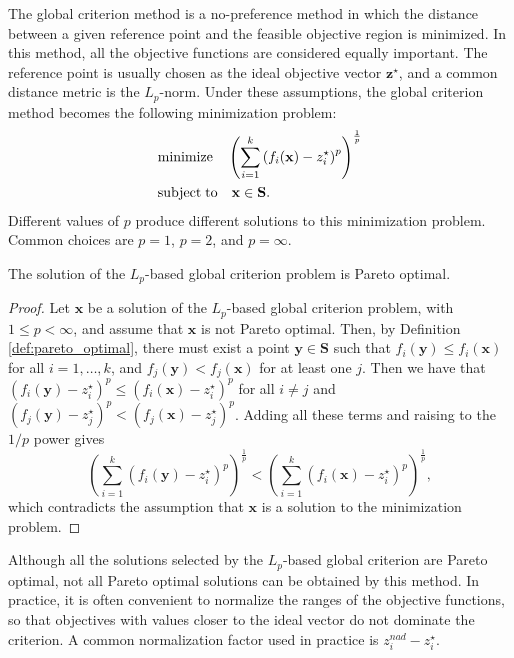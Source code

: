 The global criterion method is a no-preference method in which the distance between a given reference point and the feasible objective region is minimized. In this method, all the objective functions are considered equally important. The reference point is usually chosen as the ideal objective vector $\mathbf{z}^\star$, and a common distance metric is the $L_p$-norm. Under these assumptions, the global criterion method becomes the following minimization problem:
\begin{align*}
     & \text{minimize}    \quad \left( \sum_{i=1}^k \left( f_i(\mathbf{x}) - z_i^\star \right)^p \right)^{\frac{1}{p}} \\
     & \text{subject\;to} \quad \mathbf{x} \in \mathbf{S}.
\end{align*}
Different values of $p$ produce different solutions to this minimization problem. Common choices are $p=1$, $p=2$, and $p=\infty$. 

\begin{proposition}
\label{prop:global_criterion_pareto_optimal}
The solution of the $L_p$-based global criterion problem is Pareto optimal.
\end{proposition}
\begin{proof}
Let $\mathbf{x}$ be a solution of the $L_p$-based global criterion problem, with $1 \leq p < \infty$, and assume that $\mathbf{x}$ is not Pareto optimal. Then, by Definition \ref{def:pareto_optimal}, there must exist a point $\mathbf{y} \in \mathbf{S}$ such that $f_i( \mathbf{y} ) \leq f_i( \mathbf{x} )$ for all $i = 1, \ldots, k$, and $f_j( \mathbf{y} ) < f_j( \mathbf{x} )$ for at least one $j$. Then we have that $( f_i(\mathbf{y}) - z_i^\star )^p \leq ( f_i(\mathbf{x}) - z_i^\star )^p$ for all $i \neq j$ and $( f_j(\mathbf{y}) - z_j^\star )^p < ( f_j(\mathbf{x}) - z_j^\star )^p$. Adding all these terms and raising to the $1/p$ power gives
\[
\left( \sum_{i=1}^k \left( f_i(\mathbf{y}) - z_i^\star \right)^p \right)^{\frac{1}{p}} < \left( \sum_{i=1}^k \left( f_i(\mathbf{x}) - z_i^\star \right)^p \right)^{\frac{1}{p}},
\]
which contradicts the assumption that $\mathbf{x}$ is a solution to the minimization problem.
\end{proof}

Although all the solutions selected by the $L_p$-based global criterion are Pareto optimal, not all Pareto optimal solutions can be obtained by this method. In practice, it is often convenient to normalize the ranges of the objective functions, so that objectives with values closer to the ideal vector do not dominate the criterion. A common normalization factor used in practice is $z_i^{nad} - z_i^\star$.

